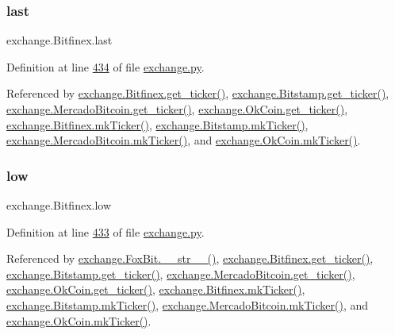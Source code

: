 \mbox{\label{classexchange_1_1_bitfinex_a56e491a27f4b3215b66e13da7796c078}} 
\subsubsection{\texorpdfstring{last}{last}}
{\footnotesize\ttfamily exchange.\+Bitfinex.\+last}



Definition at line \hyperlink{exchange_8py_source_l00434}{434} of file \hyperlink{exchange_8py_source}{exchange.\+py}.



Referenced by \hyperlink{exchange_8py_source_l00439}{exchange.\+Bitfinex.\+get\+\_\+ticker()}, \hyperlink{exchange_8py_source_l00511}{exchange.\+Bitstamp.\+get\+\_\+ticker()}, \hyperlink{exchange_8py_source_l00651}{exchange.\+Mercado\+Bitcoin.\+get\+\_\+ticker()}, \hyperlink{exchange_8py_source_l00716}{exchange.\+Ok\+Coin.\+get\+\_\+ticker()}, \hyperlink{exchange_8py_source_l00453}{exchange.\+Bitfinex.\+mk\+Ticker()}, \hyperlink{exchange_8py_source_l00525}{exchange.\+Bitstamp.\+mk\+Ticker()}, \hyperlink{exchange_8py_source_l00665}{exchange.\+Mercado\+Bitcoin.\+mk\+Ticker()}, and \hyperlink{exchange_8py_source_l00730}{exchange.\+Ok\+Coin.\+mk\+Ticker()}.

\mbox{\label{classexchange_1_1_bitfinex_a7d4241119b1fa3860743647a0c6c3416}} 
\subsubsection{\texorpdfstring{low}{low}}
{\footnotesize\ttfamily exchange.\+Bitfinex.\+low}



Definition at line \hyperlink{exchange_8py_source_l00433}{433} of file \hyperlink{exchange_8py_source}{exchange.\+py}.



Referenced by \hyperlink{exchange_8py_source_l00610}{exchange.\+Fox\+Bit.\+\_\+\+\_\+str\+\_\+\+\_\+()}, \hyperlink{exchange_8py_source_l00439}{exchange.\+Bitfinex.\+get\+\_\+ticker()}, \hyperlink{exchange_8py_source_l00511}{exchange.\+Bitstamp.\+get\+\_\+ticker()}, \hyperlink{exchange_8py_source_l00651}{exchange.\+Mercado\+Bitcoin.\+get\+\_\+ticker()}, \hyperlink{exchange_8py_source_l00716}{exchange.\+Ok\+Coin.\+get\+\_\+ticker()}, \hyperlink{exchange_8py_source_l00453}{exchange.\+Bitfinex.\+mk\+Ticker()}, \hyperlink{exchange_8py_source_l00525}{exchange.\+Bitstamp.\+mk\+Ticker()}, \hyperlink{exchange_8py_source_l00665}{exchange.\+Mercado\+Bitcoin.\+mk\+Ticker()}, and \hyperlink{exchange_8py_source_l00730}{exchange.\+Ok\+Coin.\+mk\+Ticker()}.

